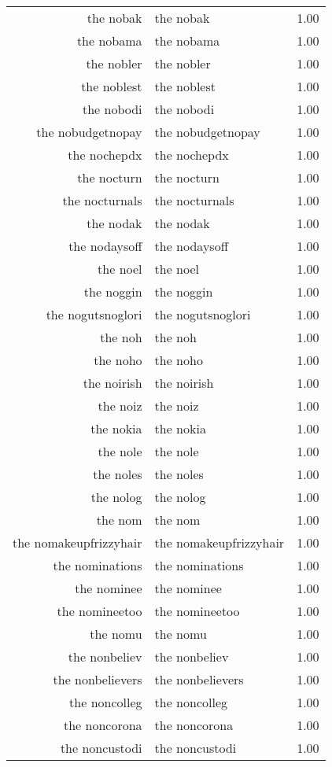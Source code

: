 \begin{table}[ht]
\begin{tabular}{rlr}
  the nobak & the nobak & 1.00 \\ 
  the nobama & the nobama & 1.00 \\ 
  the nobler & the nobler & 1.00 \\ 
  the noblest & the noblest & 1.00 \\ 
  the nobodi & the nobodi & 1.00 \\ 
  the nobudgetnopay & the nobudgetnopay & 1.00 \\ 
  the nochepdx & the nochepdx & 1.00 \\ 
  the nocturn & the nocturn & 1.00 \\ 
  the nocturnals & the nocturnals & 1.00 \\ 
  the nodak & the nodak & 1.00 \\ 
  the nodaysoff & the nodaysoff & 1.00 \\ 
  the noel & the noel & 1.00 \\ 
  the noggin & the noggin & 1.00 \\ 
  the nogutsnoglori & the nogutsnoglori & 1.00 \\ 
  the noh & the noh & 1.00 \\ 
  the noho & the noho & 1.00 \\ 
  the noirish & the noirish & 1.00 \\ 
  the noiz & the noiz & 1.00 \\ 
  the nokia & the nokia & 1.00 \\ 
  the nole & the nole & 1.00 \\ 
  the noles & the noles & 1.00 \\ 
  the nolog & the nolog & 1.00 \\ 
  the nom & the nom & 1.00 \\ 
  the nomakeupfrizzyhair & the nomakeupfrizzyhair & 1.00 \\ 
  the nominations & the nominations & 1.00 \\ 
  the nominee & the nominee & 1.00 \\ 
  the nomineetoo & the nomineetoo & 1.00 \\ 
  the nomu & the nomu & 1.00 \\ 
  the nonbeliev & the nonbeliev & 1.00 \\ 
  the nonbelievers & the nonbelievers & 1.00 \\ 
  the noncolleg & the noncolleg & 1.00 \\ 
  the noncorona & the noncorona & 1.00 \\ 
  the noncustodi & the noncustodi & 1.00 \\ 

\end{tabular}
\end{table}
